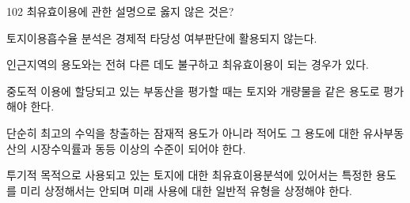 \begin{question}{102}
최유효이용에 관한 설명으로 옳지 않은 것은?
\begin{choices}
  \item 토지이용흡수율 분석은 경제적 타당성 여부판단에 활용되지 않는다.
  \item 인근지역의 용도와는 전혀 다른 데도 불구하고 최유효이용이 되는 경우가 있다.
  \item 중도적 이용에 할당되고 있는 부동산을 평가할 때는 토지와 개량물을 같은 용도로 평가해야 한다.
  \item 단순히 최고의 수익을 창출하는 잠재적 용도가 아니라 적어도 그 용도에 대한 유사부동산의 시장수익률과 동등 이상의 수준이 되어야 한다.
  \item 투기적 목적으로 사용되고 있는 토지에 대한 최유효이용분석에 있어서는 특정한 용도를 미리 상정해서는 안되며 미래 사용에 대한 일반적 유형을 상정해야 한다.
\end{choices}
\end{question}
